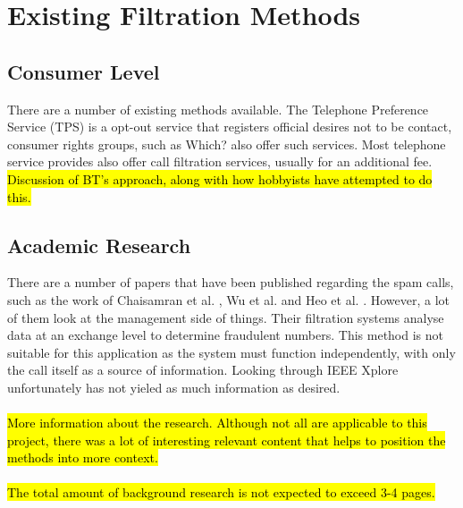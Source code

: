 \documentclass[main.tex]{subfiles}
\begin{document}
\section{Existing Filtration Methods}
\subsection{Consumer Level}
There are a number of existing methods available. The Telephone Preference Service (TPS) \cite{tps} is a opt-out service that registers official desires not to be contact, consumer rights groups, such as Which? \cite{which} also offer such services. Most telephone service provides also offer call filtration services, usually for an additional fee. \hl{Discussion of BT's approach, along with how hobbyists have attempted to do this.}

\subsection{Academic Research}
There are a number of papers that have been published regarding the spam calls, such as the work of Chaisamran et al. \cite{chaisa}, Wu et al. \cite{wu} and Heo et al. \cite{heo}. However, a lot of them look at the management side of things. Their filtration systems analyse data at an exchange level to determine fraudulent numbers. This method is not suitable for this application as the system must function independently, with only the call itself as a source of information. Looking through IEEE Xplore unfortunately has not yieled as much information as desired.
\\\\
\hl{More information about the research. Although not all are applicable to this project, there was a lot of interesting relevant content that helps to position the methods into more context. }
\\\\
\hl{The total amount of background research is not expected to exceed 3-4 pages.}
\end{document}
